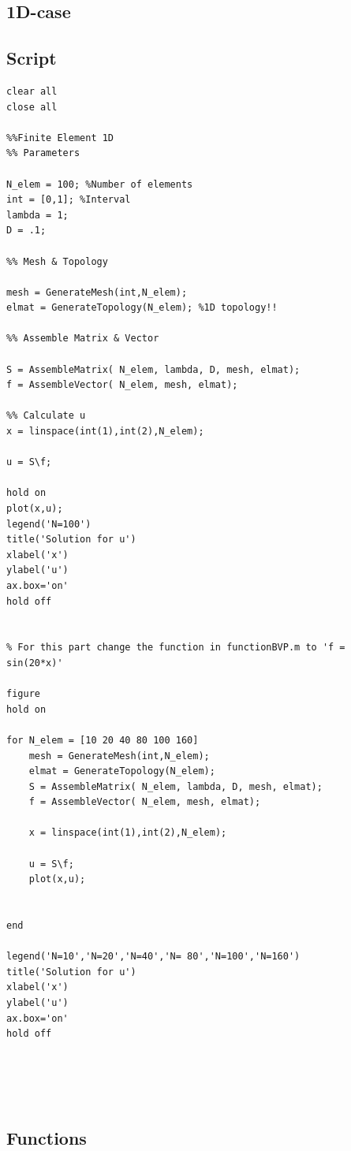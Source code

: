 \documentclass[a4paper]{report}
\begin{document}
\begin{appendices}
\chapter{1D-case}

\section{Script}
\begin{lstlisting}
clear all
close all

%%Finite Element 1D
%% Parameters

N_elem = 100; %Number of elements
int = [0,1]; %Interval
lambda = 1;
D = .1;

%% Mesh & Topology

mesh = GenerateMesh(int,N_elem);
elmat = GenerateTopology(N_elem); %1D topology!!

%% Assemble Matrix & Vector

S = AssembleMatrix( N_elem, lambda, D, mesh, elmat);
f = AssembleVector( N_elem, mesh, elmat);

%% Calculate u
x = linspace(int(1),int(2),N_elem);

u = S\f;

hold on
plot(x,u); 
legend('N=100')
title('Solution for u')
xlabel('x')
ylabel('u')
ax.box='on'
hold off


% For this part change the function in functionBVP.m to 'f = sin(20*x)'

figure 
hold on

for N_elem = [10 20 40 80 100 160]
	mesh = GenerateMesh(int,N_elem);
	elmat = GenerateTopology(N_elem);
	S = AssembleMatrix( N_elem, lambda, D, mesh, elmat);
	f = AssembleVector( N_elem, mesh, elmat);

	x = linspace(int(1),int(2),N_elem);

	u = S\f;
	plot(x,u);


end

legend('N=10','N=20','N=40','N= 80','N=100','N=160')
title('Solution for u')
xlabel('x')
ylabel('u')
ax.box='on'
hold off





\end{lstlisting}

\section{Functions}


\end{appendices}
\end{document}
